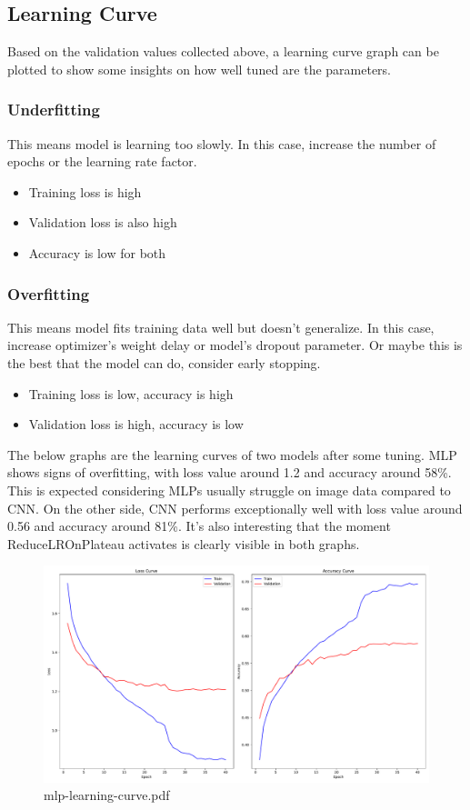 \documentclass{report}
\begin{document}
\subsection{Learning Curve}
Based on the validation values collected above, a learning curve graph can be plotted to show some insights on 
how well tuned are the parameters.

\subsubsection*{Underfitting}
This means model is learning too slowly. In this case, increase the number of epochs or the learning rate factor.

\begin{itemize}
    \item Training loss is high
    \item Validation loss is also high
    \item Accuracy is low for both
\end{itemize}


\subsubsection*{Overfitting}
This means model fits training data well but doesn't generalize. In this case, increase optimizer's weight delay 
or model's dropout parameter. Or maybe this is the best that the model can do, consider early stopping.

\begin{itemize}
    \item Training loss is low, accuracy is high
    \item Validation loss is high, accuracy is low
\end{itemize}

\noindent
The below graphs are the learning curves of two models after some tuning. MLP shows signs of overfitting, with loss value 
around 1.2 and accuracy around 58\%. This is expected considering MLPs usually struggle on image data compared to CNN. 
On the other side, CNN performs exceptionally well with loss value around 0.56 and accuracy around 81\%. It's also interesting 
that the moment ReduceLROnPlateau activates is clearly visible in both graphs.

\begin{figure}[ht!]
    \center 
    \includegraphics[scale=0.41]{../output/mlp-learning-curve.pdf}
    \caption{mlp-learning-curve.pdf}
\end{figure}
\end{document}
